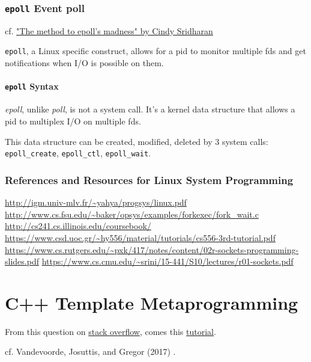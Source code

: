 \documentclass[10pt]{amsart}
\begin{document}
\section{\texttt{epoll} Event poll}

cf. \href{https://medium.com/@copyconstruct/the-method-to-epolls-madness-d9d2d6378642}{"The method to epoll's madness" by Cindy Sridharan}\cite{Srid2017}

\texttt{epoll}, a Linux specific construct, allows for a pid to monitor multiple fds and get notifications when I/O is possible on them. 


\subsection{\texttt{epoll} Syntax}

\emph{epoll}, unlike \emph{poll}, is not a system call. It's a kernel data structure that allows a pid to multiplex I/O on multiple fds.

This data structure can be created, modified, deleted by 3 system calls: \texttt{epoll\_create}, \texttt{epoll\_ctl}, \texttt{epoll\_wait}.

\section{References and Resources for Linux System Programming}

\url{http://igm.univ-mlv.fr/~yahya/progsys/linux.pdf} \\
\url{http://www.cs.fsu.edu/~baker/opsys/examples/forkexec/fork_wait.c} \\
\url{http://cs241.cs.illinois.edu/coursebook/}
\url{https://www.csd.uoc.gr/~hy556/material/tutorials/cs556-3rd-tutorial.pdf}
\url{https://www.cs.rutgers.edu/~pxk/417/notes/content/02r-sockets-programming-slides.pdf}
\url{https://www.cs.cmu.edu/~srini/15-441/S10/lectures/r01-sockets.pdf}

\part{C++ Template Metaprogramming}

From this question on \href{https://stackoverflow.com/questions/112277/best-introduction-to-c-template-metaprogramming}{stack overflow}, comes this \href{http://www.cs.rpi.edu/~musser/design/blitz/meta-art.html}{tutorial}. 

cf. Vandevoorde, Josuttis, and Gregor (2017) \cite{VJG2017}. 
\end{document}
